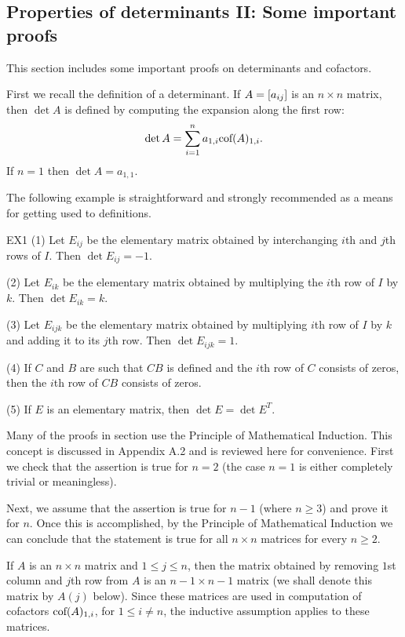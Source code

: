 \subsection{Properties of determinants II: Some important proofs } \label{sec:determinantproofs}

This section includes some important proofs on determinants and cofactors.

First we recall the definition of a determinant. If $A=\left[ a_{ij} \right]$ is an $n\times n$ matrix, then $\det A$ is defined by computing the expansion along the first row:
\begin{equation}
\label{E1} 
\det A=\sum_{i=1}^n a_{1,i} \mbox{cof}(A)_{1,i}. 
\end{equation}
If $n=1$ then $\det A=a_{1,1}$. 

The following example is straightforward and strongly recommended as a means for
getting used to definitions. 

\begin{example}{}{EX1}
(1) Let $E_{ij}$ be the elementary matrix obtained by interchanging $i$th and $j$th rows of $I$. 
Then $\det E_{ij}=-1$. 

(2) Let $E_{ik}$ be the elementary matrix obtained by multiplying the $i$th row of $I$ by $k$. 
Then $\det E_{ik}=k$. 

(3) Let $E_{ijk}$ be the elementary matrix obtained by multiplying $i$th row of $I$ by $k$ and 
adding it to its $j$th row. Then $\det E_{ijk}=1$. 

(4) If $C$ and $B$ are such that $CB$ is defined and the $i$th row of $C$ consists of zeros, 
then the $i$th row of $CB$ consists of zeros. 

(5) If $E$ is an elementary matrix, then $\det E=\det E^T$. 
\end{example} 

Many of the proofs in section use the Principle of Mathematical Induction. This concept is discussed in Appendix A.2 and is reviewed here for convenience.
First we check that the assertion is true for $n=2$ (the case $n=1$ is either completely trivial
or meaningless). 

Next, we assume that the assertion is true for $n-1$ (where $n\geq 3$) and prove it for $n$. 
Once this is accomplished, by the Principle of Mathematical Induction we can conclude that the 
statement is true for all $n\times n$ matrices for every $n\geq 2$. 

If $A$ is an $n\times n$ matrix and $1\leq j \leq n$,
then the matrix obtained by removing $1$st column and $j$th row from $A$ 
is an $n-1\times n-1$ matrix (we shall denote this matrix by $A(j)$ below). Since these matrices 
are used in computation of cofactors $\mbox{cof}(A)_{1,i}$, for $1\leq i\neq n$, 
the inductive assumption applies to these matrices. 


